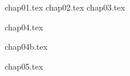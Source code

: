 
%
%

%
% 
% 
% 
% 

\frontmatter
{}
%

\clearemptydoublepage

\clearemptydoublepage

\clearemptydoublepage

\clearemptydoublepage
\renewcommand{\contentsname}{Table of Contents}
\tableofcontents*
{}
\clearemptydoublepage
\listoftables
{}
\clearemptydoublepage
\listoffigures
{}
\clearemptydoublepage
\mainmatter
{chap01.tex}
\clearemptydoublepage
{chap02.tex}
\clearemptydoublepage
%
{chap03.tex}
\clearemptydoublepage

{chap04.tex}
\clearemptydoublepage

{chap04b.tex}
\clearemptydoublepage

{chap05.tex}
\clearemptydoublepage
%
%
%
\backmatter

\clearemptydoublepage
%
%   
